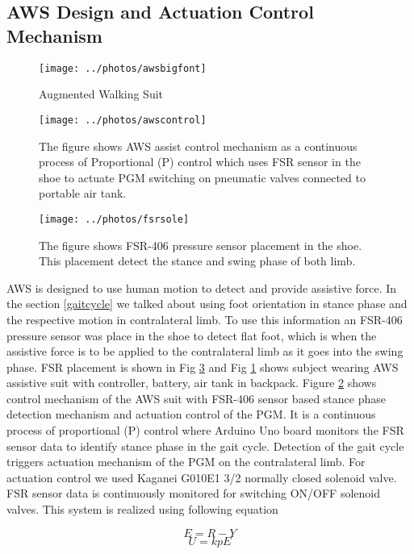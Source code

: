 \documentclass[letterpaper, 10 pt, conference]{ieeeconf}  %
\begin{document}
\subsection{AWS Design and Actuation Control Mechanism}

\begin{figure}
	\centering
	\texttt{[image: ../photos/awsbigfont]}
	\caption{Augmented Walking Suit}
	\label{fig:awsbigfont}
\end{figure}


\begin{figure}
	\centering
	\texttt{[image: ../photos/awscontrol]}
	\caption{The figure shows AWS assist control mechanism as a continuous process of Proportional (P) control which uses FSR sensor in the shoe to actuate PGM switching on pneumatic valves connected to portable air tank.}
	\label{fig:awssystem}
\end{figure}
\begin{figure}
	\centering
	\texttt{[image: ../photos/fsrsole]}
	\caption{The figure shows FSR-406 pressure sensor placement in the shoe. This placement detect the stance and swing phase of both limb.}
	\label{fig:fsrsole}
\end{figure}


AWS is designed to use human motion to detect and provide assistive force. In the section \ref{gaitcycle} we talked about using foot orientation in stance phase and the respective motion in contralateral limb. To use this information an FSR-406 pressure sensor was place in the shoe to detect flat foot, which is when the assistive force is to be applied to the contralateral limb as it goes into the swing phase. FSR placement is shown in Fig \ref{fig:fsrsole} and Fig \ref {fig:awsbigfont} shows subject wearing AWS assistive suit with controller, battery, air tank in backpack. Figure \ref{fig:awssystem} shows control mechanism of the AWS suit with FSR-406 sensor based stance phase detection mechanism and actuation control of the PGM. It is a continuous process of proportional (P) control where Arduino Uno board monitors the FSR sensor data to identify stance phase in the gait cycle. Detection of the gait cycle triggers actuation mechanism of the PGM on the contralateral limb. For actuation control we used Kaganei G010E1 3/2 normally closed solenoid valve. FSR sensor data is continuously monitored for switching ON/OFF solenoid valves. This system is realized using following equation 

\begin{equation}\label{kevalue}
E = R - Y 
\end{equation}
\begin{equation}\label{uvalue}
U = kpE
\end{equation}
\end{document}
